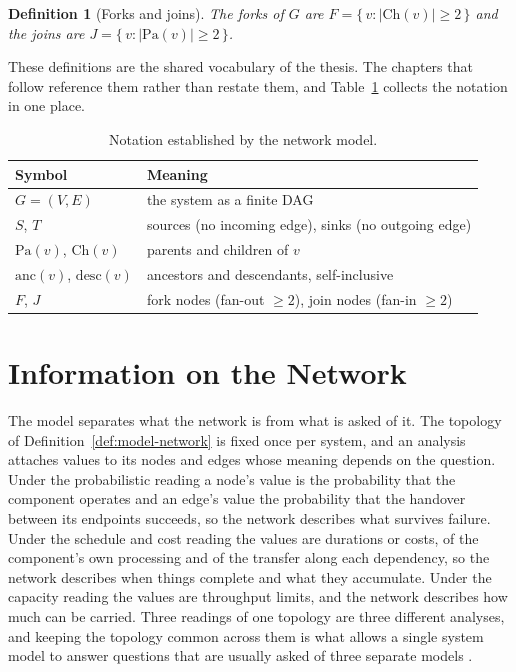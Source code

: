 \documentclass[12pt]{report}
\newtheorem{definition}{Definition}
\begin{document}
\begin{definition}[Forks and joins]
\label{def:model-forks}
The forks of $G$ are $F = \{\, v : |\mathrm{Ch}(v)| \ge 2 \,\}$ and the
joins are $J = \{\, v : |\mathrm{Pa}(v)| \ge 2 \,\}$.
\end{definition}

These definitions are the shared vocabulary of the thesis. The chapters
that follow reference them rather than restate them, and
Table~\ref{tab:model-notation} collects the notation in one place.

\begin{table}[htbp]
\centering
\caption{Notation established by the network model.}
\label{tab:model-notation}
\small
\renewcommand{\arraystretch}{1.2}
\begin{tabular}{ll}
\toprule
Symbol & Meaning \\
\midrule
$G=(V,E)$ & the system as a finite DAG \\
$S$, $T$ & sources (no incoming edge), sinks (no outgoing edge) \\
$\mathrm{Pa}(v)$, $\mathrm{Ch}(v)$ & parents and children of $v$ \\
$\mathrm{anc}(v)$, $\mathrm{desc}(v)$ & ancestors and descendants, self-inclusive \\
$F$, $J$ & fork nodes (fan-out $\ge 2$), join nodes (fan-in $\ge 2$) \\
\bottomrule
\end{tabular}
\end{table}

\section{Information on the Network}
\label{sec:model-information}

The model separates what the network is from what is asked of it. The
topology of Definition~\ref{def:model-network} is fixed once per system,
and an analysis attaches values to its nodes and edges whose meaning
depends on the question. Under the probabilistic reading a node's value
is the probability that the component operates and an edge's value the
probability that the handover between its endpoints succeeds, so the
network describes what survives failure. Under the schedule and cost
reading the values are durations or costs, of the component's own
processing and of the transfer along each dependency, so the network
describes when things complete and what they accumulate. Under the
capacity reading the values are throughput limits, and the network
describes how much can be carried. Three readings of one topology are
three different analyses, and keeping the topology common across them is
what allows a single system model to answer questions that are usually
asked of three separate models \cite{ouyang2014interdependent}.
\end{document}
